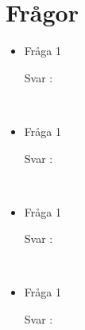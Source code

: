 \documentclass{article}
\date {#1}
\title {
    \documentTitle {Helsingborg Event and Convention Bureau}
    
    \documentDate {}
}
\begin{document}
\maketitle
\thispagestyle{empty}

\newpage




\newpage

\section{Frågor}

 
\begin{itemize}
    \item Fråga 1
        \begin{description}
            \item[Svar :]
        \end{description}
    \\
     \item Fråga 1
        \begin{description}
            \item[Svar :]
        \end{description}
    \\
    \item Fråga 1
        \begin{description}
            \item[Svar :]
        \end{description}  
    \\
     \item Fråga 1
        \begin{description}
            \item[Svar :]
        \end{description}
    \\
\end{itemize}
\end{document}

